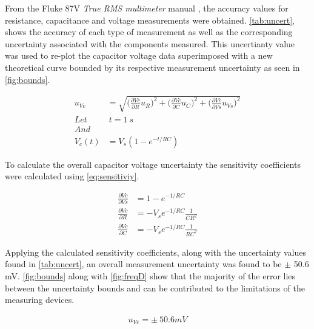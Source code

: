 \documentclass[10pt,twocolumn]{article}
\begin{document}
From the Fluke 87V \textit{True RMS multimeter} manual \citep{Fluke2017}, the accuracy values for resistance, capacitance and voltage measurements were obtained. \autoref{tab:uncert}, shows the accuracy of each type of measurement as well as the corresponding uncertainty associated with the components measured. This uncertianty value was used to re-plot the capacitor voltage data superimposed with a new theoretical curve bounded by its respective measurement uncertainty as seen in \autoref{fig:bounds}.

\begin{equation} \label{eq:uncert}
\begin{split}
u_{Vc} &= \sqrt{\bigg(\frac{\partial Vc}{\partial R}u_R\bigg)^2 + \bigg(\frac{\partial Vc}{\partial C}u_C \bigg)^2 + \bigg(\frac{\partial Vc}{\partial Vs}u_{Vs} \bigg)^2} \\
Let&\ t = 1\ s\\
And \\
V_c(t) &= V_s(1 - e^{-t/RC})
\end{split}
\end{equation} 

To calculate the overall capacitor voltage uncertainty the sensitivity coefficients were calculated using \autoref{eq:sensitiviy}. 

\begin{equation} \label{eq:sensitiviy}
\begin{split}
\frac{\partial Vc}{\partial Vs} &= 1-e^{-1/RC}\\
\frac{\partial Vc}{\partial R} &= -V_s e^{-1/RC}\frac{1}{CR^2}\\
\frac{\partial Vc}{\partial C} &= -V_s e^{-1/RC}\frac{1}{RC^2}
\end{split}
\end{equation} 

Applying the calculated sensitivity coefficients, along with the uncertainty values found in \autoref{tab:uncert}, an overall measurement uncertainty was found to be $\pm$ 50.6 mV. \autoref{fig:bounds} along with \autoref{fig:freqD} show that the majority of the error lies between the uncertainty bounds and can be contributed to the limitations of the measuring devices.

\begin{equation} \label{eq:uvc}
\begin{split}
u_{Vc} = \pm \ 50.6mV
\end{split}
\end{equation} 
\end{document}
